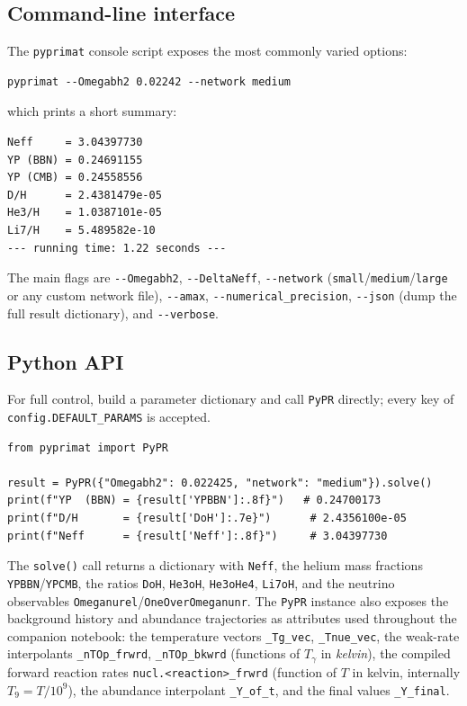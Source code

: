 \documentclass[11pt,a4paper]{article}
\newcommand{\Tg}{T_\gamma}
\newcommand{\code}[1]{\texttt{#1}}
\begin{document}
\subsection{Command-line interface}
The \code{pyprimat} console script exposes the most commonly varied options:
\begin{lstlisting}[style=sh]
pyprimat --Omegabh2 0.02242 --network medium
\end{lstlisting}
which prints a short summary:
\begin{lstlisting}[style=sh]
Neff     = 3.04397730
YP (BBN) = 0.24691155
YP (CMB) = 0.24558556
D/H      = 2.4381479e-05
He3/H    = 1.0387101e-05
Li7/H    = 5.489582e-10
--- running time: 1.22 seconds ---
\end{lstlisting}
The main flags are \code{-{}-Omegabh2}, \code{-{}-DeltaNeff}, \code{-{}-network}
(\code{small}/\code{medium}/\code{large} or any custom network file),
\code{-{}-amax}, \code{-{}-numerical\_precision}, \code{-{}-json} (dump the full
result dictionary), and \code{-{}-verbose}.

\subsection{Python API}
For full control, build a parameter dictionary and call \code{PyPR} directly;
every key of \code{config.DEFAULT\_PARAMS} is accepted.
\begin{lstlisting}[style=py]
from pyprimat import PyPR

result = PyPR({"Omegabh2": 0.022425, "network": "medium"}).solve()
print(f"YP  (BBN) = {result['YPBBN']:.8f}")   # 0.24700173
print(f"D/H       = {result['DoH']:.7e}")      # 2.4356100e-05
print(f"Neff      = {result['Neff']:.8f}")     # 3.04397730
\end{lstlisting}
The \code{solve()} call returns a dictionary with \code{Neff}, the helium mass
fractions \code{YPBBN}/\code{YPCMB}, the ratios \code{DoH}, \code{He3oH},
\code{He3oHe4}, \code{Li7oH}, and the neutrino observables
\code{Omeganurel}/\code{OneOverOmeganunr}. The \code{PyPR} instance also exposes
the background history and abundance trajectories as attributes used throughout
the companion notebook: the temperature vectors \code{\_Tg\_vec},
\code{\_Tnue\_vec}, the weak-rate interpolants \code{\_nTOp\_frwrd},
\code{\_nTOp\_bkwrd} (functions of $\Tg$ in \emph{kelvin}), the compiled forward
reaction rates \code{nucl.<reaction>\_frwrd} (function of $T$ in kelvin,
internally $T_9=T/10^9$), the abundance interpolant \code{\_Y\_of\_t}, and the
final values \code{\_Y\_final}.
\end{document}
